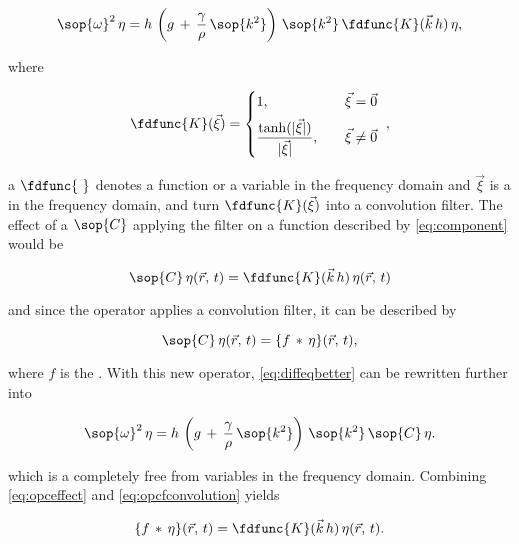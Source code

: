 \begin{equation} \label{eq:diffeqbetter}
\sop{\omega}^2\,\eta = h\,\left(g\,+\,\frac{\gamma}{\rho}\,\sop{k^2}\right)\,\sop{k^2}\,\fdfunc{K}(\vec{k}\,h)\,\eta,
\end{equation}

where

\begin{equation} \label{eq:transkernelofxivec}
\fdfunc{K}(\vec{\xi}) = \begin{cases}
1                                                  , & \quad \vec{\xi} = \vec{0} \\[.5em]
\displaystyle\frac{\tanh(|\vec{\xi}|)}{|\vec{\xi}|}, & \quad \vec{\xi} \neq \vec{0}
\end{cases}\ ,
\end{equation}

a $\fdfunc{\ }$ denotes a function or a variable in the frequency domain and $\vec{\xi}$ is a  in the frequency domain, and turn $\fdfunc{K}(\vec{\xi})$ into a convolution filter. The effect of a  $\sop{C}$ applying the filter on a function described by \eqref{eq:component} would be

\begin{equation} \label{eq:opceffect}
\sop{C}\,\eta(\vec{r},\,t) = \fdfunc{K}(\vec{k}\,h)\,\eta(\vec{r},\,t)
\end{equation}

and since the operator applies a convolution filter, it can be described by

\begin{equation} \label{eq:opcfconvolution}
\sop{C}\,\eta(\vec{r},\,t) = \{f\,*\,\eta\}(\vec{r},\,t),
\end{equation}

where $f$ is the . With this new operator, \eqref{eq:diffeqbetter} can be rewritten further into

\begin{equation} \label{eq:diffeqspatial}
\sop{\omega}^2\,\eta = h\,\left(g\,+\,\frac{\gamma}{\rho}\,\sop{k^2}\right)\,\sop{k^2}\,\sop{C}\,\eta.
\end{equation}

which is a \PDE completely free from variables in the frequency domain. Combining \eqref{eq:opceffect} and \eqref{eq:opcfconvolution} yields

\begin{equation} \label{eq:fconvolutioneffect}
\{f\,*\,\eta\}(\vec{r},\,t) = \fdfunc{K}(\vec{k}\,h)\,\eta(\vec{r},\,t).
\end{equation}

